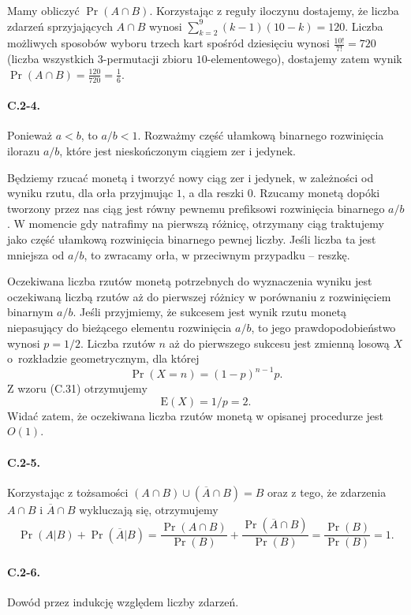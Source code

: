 Mamy obliczyć $\Pr(A\cap B)$. Korzystając z reguły iloczynu dostajemy, że liczba zdarzeń sprzyjających $A\cap B$ wynosi $\sum_{k=2}^9(k-1)(10-k)=120$. Liczba możliwych sposobów wyboru trzech kart spośród dziesięciu wynosi $\frac{10!}{7!}=720$ (liczba wszystkich $3$-permutacji zbioru $10$-elementowego), dostajemy zatem wynik $\Pr(A\cap B)=\frac{120}{720}=\frac{1}{6}$.

\paragraph{C.2-4.}
Ponieważ $a<b$, to $a/b<1$. Rozważmy część ułamkową binarnego rozwinięcia ilorazu $a/b$, które jest nieskończonym ciągiem zer i jedynek.

Będziemy rzucać monetą i tworzyć nowy ciąg zer i jedynek, w zależności od wyniku rzutu, dla orła przyjmując $1$, a dla reszki $0$. Rzucamy monetą dopóki tworzony przez nas ciąg jest równy pewnemu prefiksowi rozwinięcia binarnego $a/b$. W momencie gdy natrafimy na pierwszą różnicę, otrzymany ciąg traktujemy jako część ułamkową rozwinięcia binarnego pewnej liczby. Jeśli liczba ta jest mniejsza od $a/b$, to zwracamy orła, w przeciwnym przypadku -- reszkę.

Oczekiwana liczba rzutów monetą potrzebnych do wyznaczenia wyniku jest oczekiwaną liczbą rzutów aż do pierwszej różnicy w porównaniu z rozwinięciem binarnym $a/b$. Jeśli przyjmiemy, że sukcesem jest wynik rzutu monetą niepasujący do bieżącego elementu rozwinięcia $a/b$, to jego prawdopodobieństwo wynosi $p=1/2$. Liczba rzutów $n$ aż do pierwszego sukcesu jest zmienną losową $X$ o~rozkładzie geometrycznym, dla której
\[
	\Pr(X=n) = (1-p)^{n-1}p.
\]
Z wzoru (C.31) otrzymujemy
\[
	\mathrm{E}(X) = 1/p = 2.
\]
Widać zatem, że oczekiwana liczba rzutów monetą w opisanej procedurze jest $O(1)$.

\paragraph{C.2-5.}
Korzystając z tożsamości $(A\cap B)\cup \left(\overline{A}\cap B\right)=B$ oraz z tego, że zdarzenia $A\cap B$ i $\overline{A}\cap B$ wykluczają się, otrzymujemy
\[
	\Pr(A|B)+\Pr\left(\overline{A}|B\right) = \frac{\Pr(A\cap B)}{\Pr(B)} + \frac{\Pr\left(\overline{A}\cap B\right)}{\Pr(B)} = \frac{\Pr(B)}{\Pr(B)} = 1.
\]

\paragraph{C.2-6.}
Dowód przez indukcję względem liczby zdarzeń.

